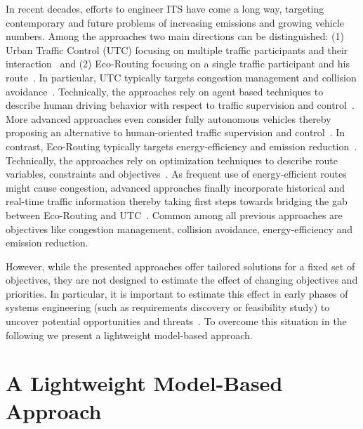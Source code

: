 \documentclass[conference]{../cls/IEEEtran}
\begin{document}
In recent decades, efforts to engineer ITS have come a long way, targeting contemporary and future problems of increasing emissions and growing vehicle numbers. Among the approaches two main directions can be distinguished: (1) Urban Traffic Control (UTC) focusing on multiple traffic participants and their interaction~\cite{Chen2010,Dresner2008} and (2) Eco-Routing focusing on a single traffic participant and his route~\cite{Ericsson2006,Boriboonsomsin2012}. In particular, UTC typically targets congestion management and collision avoidance~\cite{Chen2010}. Technically, the approaches rely on agent based techniques to describe human driving behavior with respect to traffic supervision and control~\cite{Chen2010}. More advanced approaches even consider fully autonomous vehicles thereby proposing an alternative to human-oriented traffic supervision and control~\cite{Dresner2008}. In contrast, Eco-Routing typically targets energy-efficiency and emission reduction~\cite{Ericsson2006}. Technically, the approaches rely on optimization techniques to describe route variables, constraints and objectives~\cite{Ericsson2006}. As frequent use of energy-efficient routes might cause congestion, advanced approaches finally incorporate historical and real-time traffic information thereby taking first steps towards bridging the gab between Eco-Routing and UTC~\cite{Boriboonsomsin2012}. Common among all previous approaches are objectives like congestion management, collision avoidance, energy-efficiency and emission reduction.

However, while the presented approaches offer tailored solutions for a fixed set
of objectives, they are not designed to estimate the effect of changing objectives and priorities. In particular, it is important to estimate this effect in early phases of systems engineering (such as requirements discovery or feasibility study) to uncover potential opportunities and threats~\cite{Whitten2005}. To overcome this situation in the following we present a lightweight model-based approach.

\section{A Lightweight Model-Based Approach}
\label{sec:approach}
\end{document}
